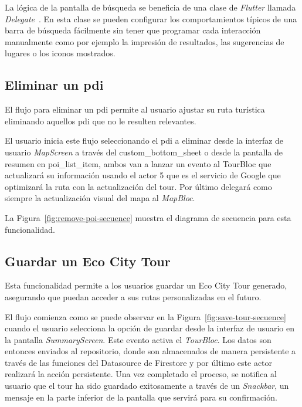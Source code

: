 
La lógica de la pantalla de búsqueda se beneficia de una clase de \textit{Flutter} llamada \textit{Delegate}~\cite{flutter_search_delegate}. En esta clase se pueden configurar los comportamientos típicos de una barra de búsqueda fácilmente sin tener que programar cada interacción manualmente como por ejemplo la impresión de resultados, las sugerencias de lugares o los iconos mostrados.

\subsection{Eliminar un \acrshort{pdi}}
El flujo para eliminar un \acrshort{pdi} permite al usuario ajustar su ruta turística eliminando aquellos \acrshort{pdi} que no le resulten  relevantes. 

El usuario inicia este flujo seleccionando el \acrshort{pdi} a eliminar desde la interfaz de usuario \textit{MapScreen} a través del custom\_bottom\_sheet o desde la pantalla de resumen en poi\_list\_item, ambos van a lanzar un evento al TourBloc que actualizará su información usando el actor 5 que es el servicio de Google que optimizará la ruta con la actualización del tour. Por último delegará como siempre la actualización visual del mapa al \textit{MapBloc}. 

La Figura~\ref{fig:remove-poi-secuence} muestra el diagrama de secuencia para esta funcionalidad.


\subsection{Guardar un Eco City Tour}
Esta funcionalidad permite a los usuarios guardar un Eco City Tour generado, asegurando que puedan acceder a sus rutas personalizadas en el futuro. 

El flujo comienza como se puede observar en la Figura~\ref{fig:save-tour-secuence} cuando el usuario selecciona la opción de guardar desde la interfaz de usuario en la pantalla \textit{SummaryScreen}. Este evento activa el \textit{TourBloc}. Los datos son entonces enviados al repositorio, donde son almacenados de manera persistente a través de las funciones del Datasource de Firestore y por último este actor realizará la acción persistente. Una vez completado el proceso, se notifica al usuario que el tour ha sido guardado exitosamente a través de un \textit{Snackbar}, un mensaje en la parte inferior de la pantalla que servirá para su confirmación.


